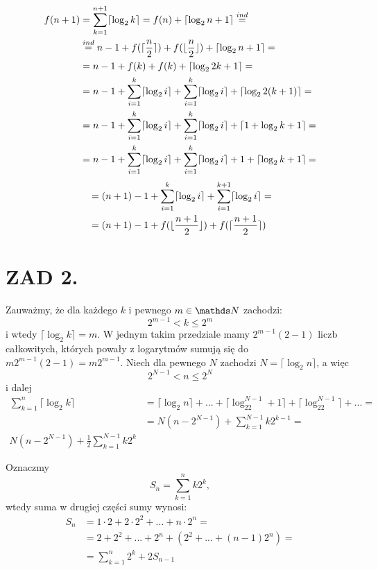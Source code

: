 \documentclass{article}[13pt]
\begin{document}
    \begin{align*}
        f(n+1)&=\sum\limits_{k=1}^{n+1}\lceil\log_2k\rceil=f(n)+\lceil\log_2n+1\rceil\overset{ind}{=}\\
        &\overset{ind}{=}n-1+f(\lceil{n\over2}\rceil)+f(\lfloor{n\over2}\rfloor)+\lceil\log_2n+1\rceil=\\
        &=n-1+f(k)+f(k)+\lceil\log_22k+1\rceil=\\
        &=n-1+\sum\limits_{i=1}^{k}\lceil\log_2i\rceil+\sum\limits_{i=1}^k\lceil\log_2i\rceil+\lceil\log_22(k+1)\rceil=\\
        &=n-1+\sum\limits_{i=1}^{k}\lceil\log_2i\rceil+\sum\limits_{i=1}^k\lceil\log_2i\rceil+\lceil1+\log_2k+1\rceil=\\
        &=n-1+\sum\limits_{i=1}^{k}\lceil\log_2i\rceil+\sum\limits_{i=1}^k\lceil\log_2i\rceil+1+\lceil\log_2k+1\rceil=
    \end{align*}
    \begin{align*}
        &=(n+1)-1+\sum\limits_{i=1}^{k}\lceil\log_2i\rceil+\sum\limits_{i=1}^{k+1}\lceil\log_2i\rceil=\\
        &=(n+1)-1+f(\lfloor{n+1\over2}\rfloor)+f(\lceil{n+1\over2}\rceil)
    \end{align*}


    \section*{ZAD 2.}

    Zauważmy, że dla każdego $k$ i pewnego $m\in\N$ zachodzi:
    $$2^{m-1}< k \leq 2^m$$
    i wtedy $\lceil\log_2 k\rceil = m$. W jednym takim przedziale mamy $2^{m-1}(2-1)$ liczb całkowitych, których powały z logarytmów sumują się do $m2^{m-1}(2-1)=m2^{m-1}$. Niech dla pewnego $N$ zachodzi $N=\lceil\log_2n\rceil$, a więc
    $$2^{N-1}<n\leq 2^N$$
    i dalej
    \begin{align*}
        \sum\limits_{k=1}^n\lceil\log_2k\rceil&=\lceil\log_2n\rceil+...+\lceil\log_22^{N-1}+1\rceil+\lceil\log_22^{N-1}\rceil+...=\\
        &=N(n-2^{N-1})+\sum\limits_{k=1}^{N-1}k2^{k-1}=\\
        N(n-2^{N-1})+\frac12\sum\limits_{k=1}^{N-1}k2^k
    \end{align*}

    Oznaczmy
    $$S_n=\sum\limits_{k=1}^nk2^k,$$
    wtedy suma w drugiej części sumy wynosi:
    \begin{align*}
        S_n&=1\cdot2+2\cdot 2^2+...+ n\cdot2^n=\\
            &=2+2^2+...+2^n+(2^2+...+(n-1)2^n)=\\
            &=\sum\limits_{k=1}^n2^k+2S_{n-1}
    \end{align*}
\end{document}
